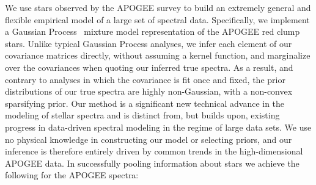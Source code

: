 \documentclass[a4paper,fleqn,usenatbib]{mnras}
\begin{document}
We use stars observed by the APOGEE survey to build an extremely general and flexible empirical model of a large set of spectral data. Specifically, we implement a Gaussian Process~\citep{Rasmussen_Williams} mixture model representation of the APOGEE red clump stars. Unlike typical Gaussian Process analyses, we infer each element of our covariance matrices directly, without assuming a kernel function, and marginalize over the covariances when quoting our inferred true spectra. As a result, and contrary to analyses in which the covariance is fit once and fixed, the prior distributions of our true spectra are highly non-Gaussian, with a non-convex sparsifying prior. Our method is a significant new technical advance in the modeling of stellar spectra and is distinct from, but builds upon, existing progress in data-driven spectral modeling in the regime of large data sets. We use no physical knowledge in constructing our model or selecting priors, and our inference is therefore entirely driven by common trends in the high-dimensional APOGEE data. In successfully pooling information about stars we achieve the following for the APOGEE spectra:
\end{document}
